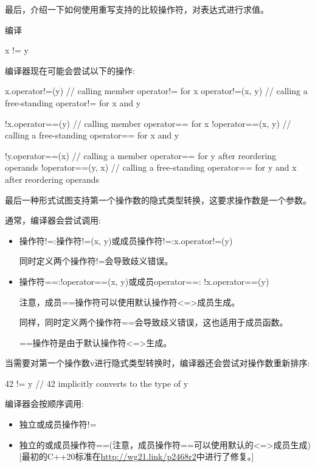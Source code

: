 最后，介绍一下如何使用重写支持的比较操作符，对表达式进行求值。


编译

\begin{cpp}
x != y
\end{cpp}

编译器现在可能会尝试以下的操作:

\begin{cpp}
x.operator!=(y) // calling member operator!= for x
operator!=(x, y) // calling a free-standing operator!= for x and y

!x.operator==(y) // calling member operator== for x
!operator==(x, y) // calling a free-standing operator== for x and y

!y.operator==(x)   // calling a member operator== for y after reordering operands
!operator==(y, x)  // calling a free-standing operator== for y and x after reordering operands
\end{cpp}

最后一种形式试图支持第一个操作数的隐式类型转换，这要求操作数是一个参数。

通常，编译器会尝试调用:

\begin{itemize}
\item
操作符!=:操作符!=(x, y)或成员操作符!=:x.operator!=(y)

同时定义两个操作符!=会导致歧义错误。

\item
操作符==:!operator==(x, y)或成员operator==: !x.operator==(y)

注意，成员==操作符可以使用默认操作符<=>成员生成。

同样，同时定义两个操作符==会导致歧义错误，这也适用于成员函数。

==操作符是由于默认操作符<=>生成。
\end{itemize}

当需要对第一个操作数v进行隐式类型转换时，编译器还会尝试对操作数重新排序:

\begin{cpp}
42 != y // 42 implicitly converts to the type of y
\end{cpp}

编译器会按顺序调用:

\begin{itemize}
\item
独立或成员操作符!=

\item
独立的或成员操作符==(注意，成员操作符==可以使用默认的<=>成员生成)[最初的C++20标准在\url{http://wg21.link/p2468r2}中进行了修复。]
\end{itemize}

